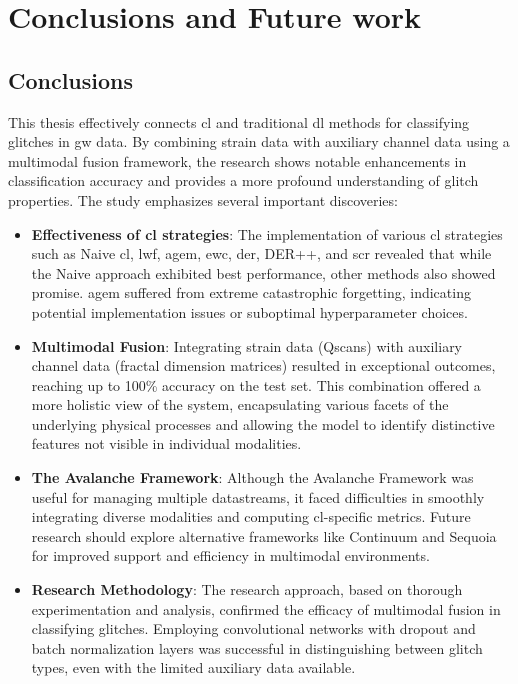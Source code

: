 \chapter{Conclusions and Future work}
\section{Conclusions}
This thesis effectively connects \acrshort{cl} and traditional \acrshort{dl} methods for classifying glitches in \acrshort{gw} data. By combining strain data with auxiliary channel data using a multimodal fusion framework, the research shows notable enhancements in classification accuracy and provides a more profound understanding of glitch properties. The study emphasizes several important discoveries: 
\begin{itemize}
    \item \textbf{Effectiveness of \acrshort{cl} strategies}: The implementation of various \acrshort{cl} strategies such as Naive \acrshort{cl}, \acrfull{lwf}, \acrfull{agem}, \acrfull{ewc}, \acrfull{der}, DER++, and \acrfull{scr} revealed that while the Naive approach exhibited best performance, other methods also showed promise. \acrshort{agem} suffered from extreme catastrophic forgetting, indicating potential implementation issues or suboptimal hyperparameter choices. 
    \item \textbf{Multimodal Fusion}: Integrating strain data (Qscans) with auxiliary channel data (fractal dimension matrices) resulted in exceptional outcomes, reaching up to 100\% accuracy on the test set. This combination offered a more holistic view of the system, encapsulating various facets of the underlying physical processes and allowing the model to identify distinctive features not visible in individual modalities. 
    \item \textbf{The Avalanche Framework}: Although the Avalanche Framework was useful for managing multiple datastreams, it faced difficulties in smoothly integrating diverse modalities and computing \acrshort{cl}-specific metrics. Future research should explore alternative frameworks like Continuum and Sequoia for improved support and efficiency in multimodal environments. 
    \item \textbf{Research Methodology}: The research approach, based on thorough experimentation and analysis, confirmed the efficacy of multimodal fusion in classifying glitches. Employing convolutional networks with dropout and batch normalization layers was successful in distinguishing between glitch types, even with the limited auxiliary data available. 
\end{itemize}

